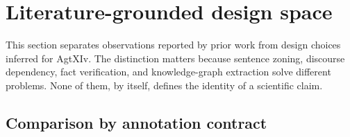 \section{Literature-grounded design space}\label{sec:literature}

This section separates observations reported by prior work from design choices inferred for AgtXIv. The distinction matters because sentence zoning, discourse dependency, fact verification, and knowledge-graph extraction solve different problems. None of them, by itself, defines the identity of a scientific claim.

\subsection{Comparison by annotation contract}

